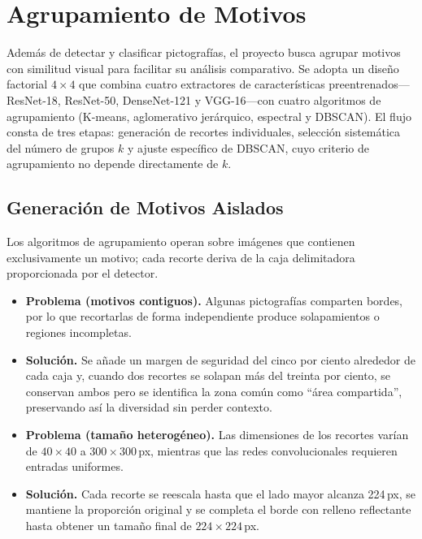 \section{Agrupamiento de Motivos}\label{sec:agrupamiento}

Además de detectar y clasificar pictografías, el proyecto busca agrupar motivos con similitud visual para facilitar su análisis comparativo.
Se adopta un diseño factorial \(4\times4\) que combina cuatro extractores de características preentrenados—ResNet-18, ResNet-50, DenseNet-121 y VGG-16—con cuatro algoritmos de agrupamiento (K-means, aglomerativo jerárquico, espectral y DBSCAN).
El flujo consta de tres etapas: generación de recortes individuales, selección sistemática del número de grupos \(k\) y ajuste específico de DBSCAN, cuyo criterio de agrupamiento no depende directamente de \(k\).

\subsection{Generación de Motivos Aislados}\label{ssec:crop_motifs}

Los algoritmos de agrupamiento operan sobre imágenes que contienen exclusivamente un motivo; cada recorte deriva de la caja delimitadora proporcionada por el detector.

\begin{itemize}
  \item \textbf{Problema (motivos contiguos).}
        Algunas pictografías comparten bordes, por lo que recortarlas de forma independiente produce solapamientos o regiones incompletas.
  \item \textbf{Solución.}
        Se añade un margen de seguridad del cinco por ciento alrededor de cada caja y, cuando dos recortes se solapan más del treinta por ciento, se conservan ambos pero se identifica la zona común como ``área compartida'', preservando así la diversidad sin perder contexto.

  \item \textbf{Problema (tamaño heterogéneo).}
        Las dimensiones de los recortes varían de \(40\times40\) a \(300\times300\)\,px, mientras que las redes convolucionales requieren entradas uniformes.
  \item \textbf{Solución.}
        Cada recorte se reescala hasta que el lado mayor alcanza 224\,px, se mantiene la proporción original y se completa el borde con relleno reflectante hasta obtener un tamaño final de \(224\times224\)\,px.
\end{itemize}

